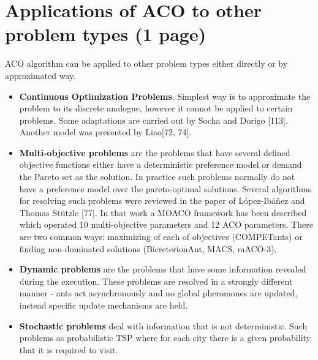 \section{Applications of ACO to other problem types (1 page)}
ACO algorithm can be applied to other problem types either directly or by approximated way.

\begin{itemize}
\item \textbf{Continuous Optimization Problems}. Simplest way is to approximate the problem to its discrete analogue, however it cannot be applied to certain problems. Some adaptations are carried out by Socha and Dorigo [113]. Another model was presented by Liao[72, 74].

\item \textbf{Multi-objective problems} are the problems that have several defined objective functions either have a deterministic preference model or demand the Pareto set as the solution. In practice such problems normally do not have a preference model over the pareto-optimal solutions. Several algorithms for resolving such problems were reviewed in the paper of L{\'o}pez-Ib{\'a}{\~n}ez and Thomas St{\"u}tzle [77]. In that work a MOACO framework has been described which operated 10 multi-objective parameters and 12 ACO parameters. There are two common ways: maximizing of each of objectives (COMPETants) or finding non-dominated solutions (BicreterionAnt, MACS, mACO-3).

\item \textbf{Dynamic problems} are the problems that have some information revealed during the execution. These problems are resolved in a strongly different manner - ants act asynchronously and no global pheromones are updated, instead specific update mechanisms are held.

\item \textbf{Stochastic problems} deal with information that is not deterministic. Such problems as probabilistic TSP where for each city there is a given probability that it is required to visit.
\end{itemize}
